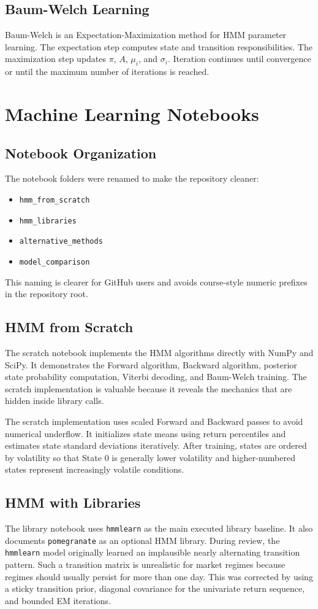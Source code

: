 \documentclass[12pt,a4paper]{report}
\begin{document}
\section{Baum-Welch Learning}
Baum-Welch is an Expectation-Maximization method for HMM parameter learning. The expectation step computes state and transition responsibilities. The maximization step updates $\pi$, $A$, $\mu_i$, and $\sigma_i$. Iteration continues until convergence or until the maximum number of iterations is reached.

\chapter{Machine Learning Notebooks}
\section{Notebook Organization}
The notebook folders were renamed to make the repository cleaner:
\begin{itemize}
    \item \texttt{hmm\_from\_scratch}
    \item \texttt{hmm\_libraries}
    \item \texttt{alternative\_methods}
    \item \texttt{model\_comparison}
\end{itemize}
This naming is clearer for GitHub users and avoids course-style numeric prefixes in the repository root.

\section{HMM from Scratch}
The scratch notebook implements the HMM algorithms directly with NumPy and SciPy. It demonstrates the Forward algorithm, Backward algorithm, posterior state probability computation, Viterbi decoding, and Baum-Welch training. The scratch implementation is valuable because it reveals the mechanics that are hidden inside library calls.

The scratch implementation uses scaled Forward and Backward passes to avoid numerical underflow. It initializes state means using return percentiles and estimates state standard deviations iteratively. After training, states are ordered by volatility so that State 0 is generally lower volatility and higher-numbered states represent increasingly volatile conditions.

\section{HMM with Libraries}
The library notebook uses \texttt{hmmlearn} as the main executed library baseline. It also documents \texttt{pomegranate} as an optional HMM library. During review, the \texttt{hmmlearn} model originally learned an implausible nearly alternating transition pattern. Such a transition matrix is unrealistic for market regimes because regimes should usually persist for more than one day. This was corrected by using a sticky transition prior, diagonal covariance for the univariate return sequence, and bounded EM iterations.
\end{document}
